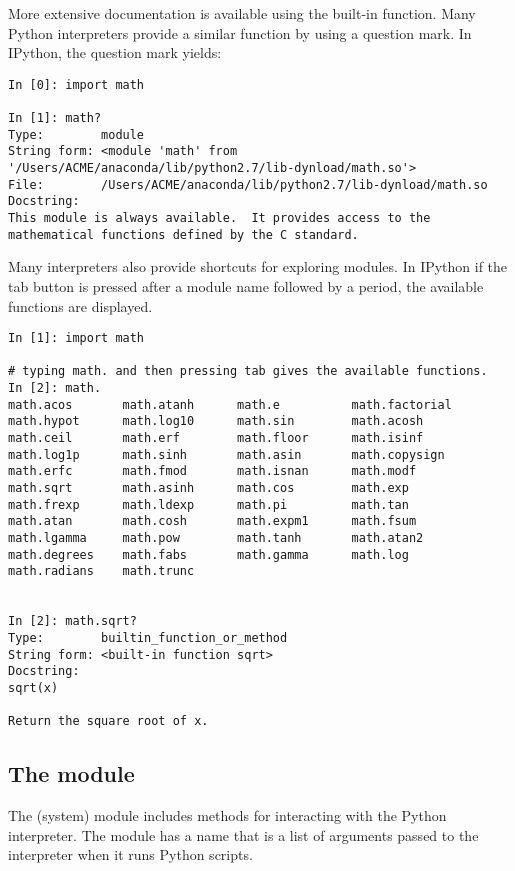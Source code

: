 More extensive documentation is available using the  built-in function.
Many Python interpreters provide a similar function by using a question mark.
In IPython, the question mark yields:

\begin{lstlisting}
In [0]: import math

In [1]: math?
Type:        module
String form: <module 'math' from '/Users/ACME/anaconda/lib/python2.7/lib-dynload/math.so'>
File:        /Users/ACME/anaconda/lib/python2.7/lib-dynload/math.so
Docstring:
This module is always available.  It provides access to the
mathematical functions defined by the C standard.
\end{lstlisting}

Many interpreters also provide shortcuts for exploring modules.
In IPython if the tab button is pressed after a module name followed by a period, the available functions are displayed.

\begin{lstlisting}
In [1]: import math

# typing math. and then pressing tab gives the available functions.
In [2]: math.
math.acos       math.atanh      math.e          math.factorial  
math.hypot      math.log10      math.sin        math.acosh      
math.ceil       math.erf        math.floor      math.isinf      
math.log1p      math.sinh       math.asin       math.copysign   
math.erfc       math.fmod       math.isnan      math.modf       
math.sqrt       math.asinh      math.cos        math.exp        
math.frexp      math.ldexp      math.pi         math.tan        
math.atan       math.cosh       math.expm1      math.fsum       
math.lgamma     math.pow        math.tanh       math.atan2      
math.degrees    math.fabs       math.gamma      math.log        
math.radians    math.trunc


In [2]: math.sqrt?
Type:        builtin_function_or_method
String form: <built-in function sqrt>
Docstring:
sqrt(x)

Return the square root of x.
\end{lstlisting}

\subsection*{The  module}

The  (system) module includes methods for interacting with the Python interpreter.
The module has a name  that is a list of arguments passed to the interpreter when it runs Python scripts.

